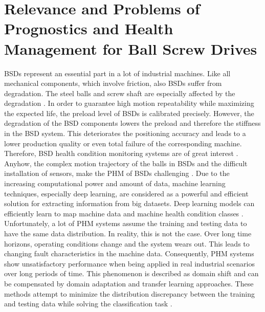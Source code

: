 \section{Relevance and Problems of Prognostics and Health Management for Ball Screw Drives}
BSDs represent an essential part in a lot of industrial machines. Like all mechanical components, which involve friction, also BSDs suffer from degradation. The steel balls and screw shaft are especially affected by the degradation \cite{Pandhare2021}. In order to guarantee high motion repeatability while maximizing the expected life, the preload level of BSDs is calibrated precisely. However, the degradation of the BSD components lowers the preload and therefore the stiffness in the BSD system. This deteriorates the positioning accuracy and leads to a lower production quality or even total failure of the corresponding machine. Therefore, BSD health condition monitoring systems are of great interest \cite{Pandhare2021}. Anyhow, the complex motion trajectory of the balls in BSDs and the difficult installation of sensors, make the PHM of BSDs challenging \cite{LiPin2018}. Due to the increasing computational power and amount of data, machine learning techniques, especially deep learning, are considered as a powerful and efficient solution for extracting information from big datasets. Deep learning models can efficiently learn to map machine data and machine health condition classes \cite{ZHAO2019213}. Unfortunately, a lot of PHM systems assume the training and testing data to have the same data distribution. In reality, this is not the case. Over long time horizons, operating conditions change and the system wears out. This leads to changing fault characteristics in the machine data. Consequently, PHM systems show unsatisfactory performance when being applied in real industrial scenarios over long periods of time. This phenomenon is described as domain shift and can be compensated by domain adaptation and transfer learning approaches. These methods attempt to minimize the distribution discrepancy between the training and testing data while solving the classification task \cite{AZAMFAR2020103932}.


